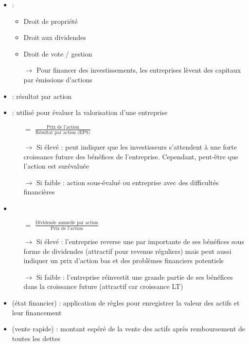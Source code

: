 \begin{itemize}
    \item {} :
    \begin{itemize}
        \item Droit de propriété
        \item Droit aux dividendes
        \item Droit de vote / gestion
        \item[$\rightarrow$] Pour financer des investissements, les entreprises lèvent des capitaux par émissions d'actions
    \end{itemize}
    \item {} : résultat par action
    \item {} : utilisé pour évaluer la valorisation d'une entreprise
    \begin{itemize}
        \item[$=$] $\frac{\text{Prix de l'action}}{\text{Résultat par action (EPS)}}$
        \item[$\rightarrow$] Si élevé : peut indiquer que les investisseurs s'attendent à une forte croissance future des bénéfices de l'entreprise. Cependant, peut-être que l'action est surévaluée
        \item[$\rightarrow$] Si faible : action sous-évalué ou entreprise avec des difficultés financières
    \end{itemize}
    \item {}
    \begin{itemize}
        \item[$=$] $\frac{\text{Dividende annuelle par action}}{\text{Prix de l'action}}$
        \item[$\rightarrow$] Si élevé : l'entreprise reverse une par importante de ses bénéfices sous forme de dividendes (attractif pour revenus réguliers) mais peut aussi indiquer un prix d'action bas et des problèmes financiers potentiels
        \item[$\rightarrow$] Si faible : l'entreprise réinvestit une grande partie de ses bénéfices dans la croissance future (attractif car croissance LT)
    \end{itemize}
    \item {} (état financier) : application de règles pour enregistrer la valeur des actifs et leur financement
    \item {} (vente rapide) : montant espéré de la vente des actifs après remboursement de toutes les dettes

\end{itemize}
